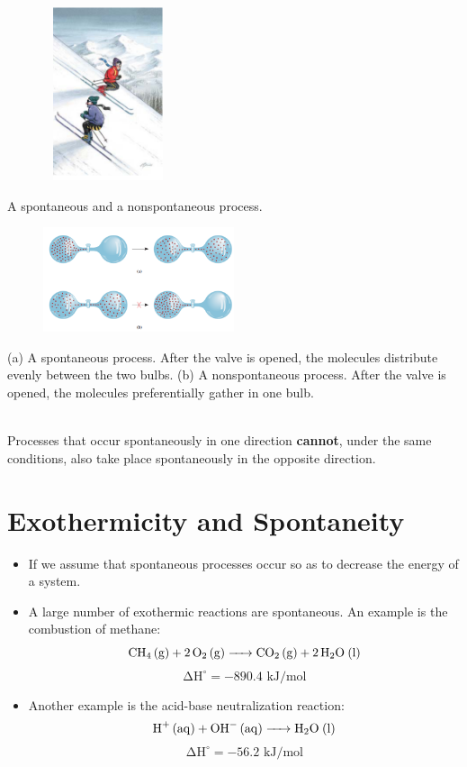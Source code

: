\documentclass[a4paper,12pt,twocolumn]{article}
\begin{document}
\begin{figure}[h]
\centering
\includegraphics[width=1.5in, height=2in]{ski.png}
\end{figure}
A spontaneous and a nonspontaneous process.
\begin{figure}[h]
\centering
\includegraphics[width=0.5\textwidth]{spontanity.png}
\end{figure}
(a) A spontaneous process. After the valve is opened, the molecules distribute evenly between the two bulbs. (b) A nonspontaneous process. After the valve is opened, the molecules preferentially gather in one bulb.
\\
\\
\begin{Box1}{}
{\large Processes that occur spontaneously in one direction \textbf{cannot}, under the same conditions, also take place spontaneously in the opposite direction.}
\end{Box1}

\section{Exothermicity and Spontaneity}
\begin{itemize}
\item If we assume that spontaneous processes occur so as to decrease the energy of a system.
\item A large number of exothermic reactions are spontaneous. An example is the combustion of methane:
$$\ce{CH4 (g) + 2O2 (g) -> CO2 (g) + 2H2O (l)}$$
$$\mathrm{\Delta H^{\circ} = -890.4 \text{ kJ/mol}}$$
\item Another example is the acid-base neutralization reaction:
$$\ce{H^+ (aq) + OH^- (aq) -> H2O (l)}$$
$$\mathrm{\Delta H^{\circ} = -56.2 \text{ kJ/mol}}$$
\end{itemize}
\end{document}
